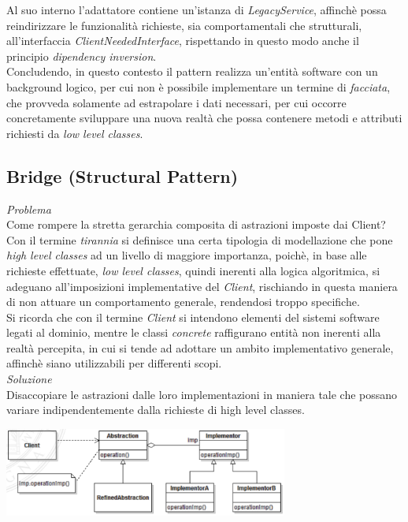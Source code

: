 \documentclass{article}
\begin{document}
Al suo interno l'adattatore contiene un'istanza di \textit{LegacyService}, affinchè possa reindirizzare le funzionalità richieste, sia comportamentali che strutturali, all'interfaccia \textit{ClientNeededInterface}, rispettando in questo modo anche il principio \textit{dipendency inversion}.\vspace*{7pt}\\
Concludendo, in questo contesto il pattern realizza un'entità software con un background logico, per cui non è possibile implementare un termine di \textit{facciata}, che provveda solamente ad estrapolare i dati necessari, per cui occorre concretamente sviluppare una nuova realtà che possa contenere metodi e attributi richiesti da \textit{low level classes}.

\subsection*{Bridge (Structural Pattern)}
\large
\textit{Problema}\\
Come rompere la stretta gerarchia composita di astrazioni imposte dai Client?\vspace*{14pt}\\
Con il termine \textit{tirannia} si definisce una certa tipologia di modellazione che pone \textit{high level classes} ad un livello di maggiore importanza, poichè, in base alle richieste effettuate, \textit{low level classes}, quindi inerenti alla logica algoritmica, si adeguano all'imposizioni implementative del \textit{Client}, rischiando in questa maniera di non attuare un comportamento generale, rendendosi troppo specifiche.\vspace*{7pt}\\
Si ricorda che con il termine \textit{Client} si intendono elementi del sistemi software legati al dominio, mentre le classi \textit{concrete} raffigurano entità non inerenti alla realtà percepita, in cui si tende ad adottare un ambito implementativo generale, affinchè siano utilizzabili per differenti scopi.\vspace*{14pt}\\
\textit{Soluzione}\\
Disaccopiare le astrazioni dalle loro implementazioni in maniera tale che possano variare indipendentemente dalla richieste di high level classes.\vspace*{7pt}
\begin{center}
    \includegraphics[width=0.7\textwidth]{foto 7.png}
\end{center}
\end{document}
